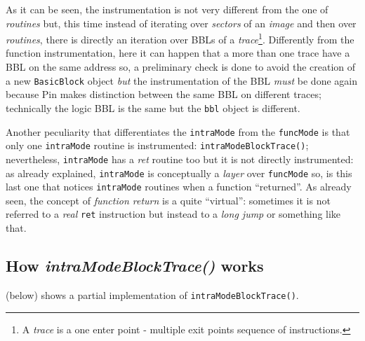 \documentclass[a4paper,10pt]{report}
\begin{document}
\noindent
As it can be seen, the instrumentation is not very different from the one
of \emph{routines} but, this time instead of iterating over \emph{sectors} of an \emph{image} and then over \emph{routines}, 
there is directly an iteration over BBLs of a 
\emph{trace}\footnote{A \emph{trace} is a one enter point - multiple exit points sequence of instructions.}. Differently from the function instrumentation, here it can happen 
that a more than one trace have a BBL on the same address so, 
a preliminary check is done to avoid the creation of 
a new \verb|BasicBlock| object \emph{but} the instrumentation of the BBL \emph{must}
be done again because Pin makes distinction between the same BBL on different traces; 
technically the logic BBL is the same but the \verb|bbl| object is different.

Another peculiarity that differentiates the \verb|intraMode| from
 the \verb|funcMode| is that only one \verb|intraMode| routine is instrumented: 
\verb|intraModeBlockTrace()|; nevertheless, \verb|intraMode| has a \emph{ret} routine
too but it is not directly instrumented: as already explained, 
\verb|intraMode| is conceptually a \emph{layer} over \verb|funcMode| so, 
is this last one that notices \verb|intraMode| routines when a function ``returned''.
As already seen, the concept of \emph{function return} is a quite ``virtual'': 
sometimes it is not referred to a \emph{real} \verb|ret| instruction 
but instead to a \emph{long jump} or something like that. 

\subsection{How \emph{intraModeBlockTrace()} works}

 (below) shows a partial 
implementation of \verb|intraModeBlockTrace()|.
\end{document}
